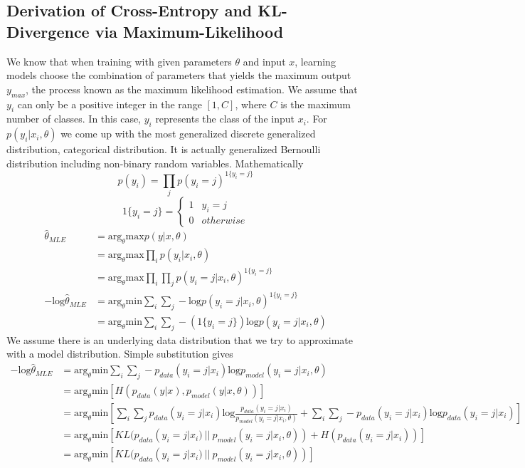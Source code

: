 \documentclass{article}
\numberwithin{equation}{subsection}
\begin{document}
\subsection{Derivation of Cross-Entropy and KL-Divergence via Maximum-Likelihood}
We know that when training with given parameters $\theta$ and input $x$, learning models choose the combination of parameters that yields the maximum output $y_{max}$, the process known as the maximum likelihood estimation. We assume that $y_i$ can only be a positive integer in the range $[1,C]$, where $C$ is the maximum number of classes. In this case, $y_i$ represents the class of the input $x_i$.
For $p(y_i|x_i,\theta)$ we come up with the most generalized discrete generalized distribution, categorical distribution. It is actually generalized Bernoulli distribution including non-binary random variables. Mathematically
\begin{equation}
    p(y_i) = \prod_j p(y_i=j)^{1\{y_i=j\}}
\end{equation}
\begin{equation}
1\{y_i=j\} = \begin{cases}
    1 & y_i=j\\
    0 & otherwise
    \end{cases}
\end{equation}
\begin{align}
    \hat{\theta}_{MLE} &= \text{arg}_\theta \text{max}p(y|x,\theta)\\
     &= \text{arg}_\theta \text{max} \prod_i p(y_i|x_i,\theta)\\
     &= \text{arg}_\theta \text{max} \prod_i \prod_j p(y_i=j|x_i,\theta)^{1\{y_i=j\}}\\
     -\text{log}\hat{\theta}_{MLE} &= \text{arg}_\theta \text{min} \sum_i \sum_j -\text{log}p(y_i=j|x_i,\theta)^{1\{y_i=j\}}\\
     &= \text{arg}_\theta \text{min} \sum_i \sum_j -(1\{y_i=j\})\text{log}p(y_i=j|x_i,\theta)
\end{align} 
We assume there is an underlying data distribution that we try to approximate with a model distribution. Simple substitution gives 
\begin{align}
    -\text{log}\hat{\theta}_{MLE} &= \text{arg}_\theta \text{min} \sum_i \sum_j -p_{data}(y_i=j|x_i)\text{log}p_{model}(y_i=j|x_i,\theta)\\
    &= \text{arg}_\theta \text{min} [H(p_{data}(y|x),p_{model}(y|x,\theta))]\\
    &= \text{arg}_\theta \text{min} [\sum_i \sum_j p_{data}(y_i=j|x_i)\text{log}\frac{p_{data}(y_i=j|x_i)}{p_{model}(y_i=j|x_i,\theta)} + \sum_i \sum_j -p_{data}(y_i=j|x_i)\text{log}p_{data}(y_i=j|x_i)]\\
    &= \text{arg}_\theta \text{min}[KL(p_{data}(y_i=j|x_i)\ ||\ p_{model}(y_i=j|x_i,\theta)) + H(p_{data}(y_i=j|x_i))]\\
    &= \text{arg}_\theta \text{min}[KL(p_{data}(y_i=j|x_i)\ ||\ p_{model}(y_i=j|x_i,\theta))]
\end{align}
\end{document}
